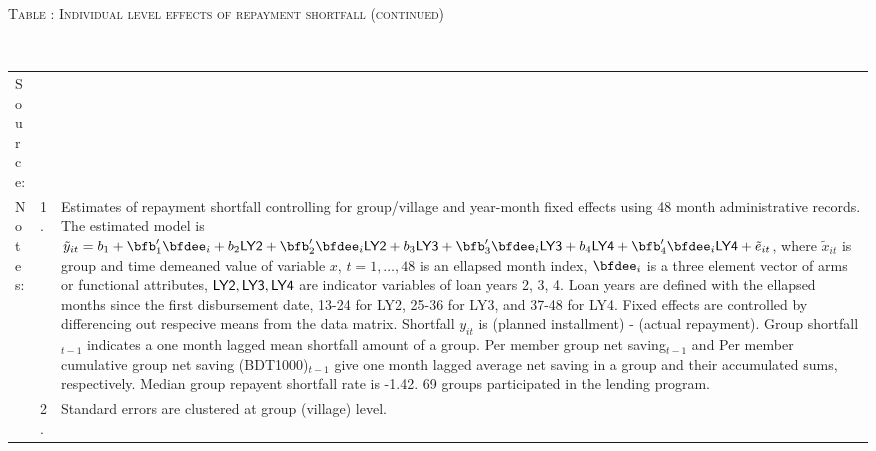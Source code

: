 \addtocounter{table}{-1}
\hspace{-1cm}\begin{minipage}[t]{14cm}
\hfil\textsc{\normalsize Table \thetable: Individual level effects of repayment shortfall (continued)\label{tab shortfall indiv o800 3}}\\
\setlength{\tabcolsep}{1pt}
\setlength{\baselineskip}{8pt}
\renewcommand{\arraystretch}{.6}
\hfil{}\\
\renewcommand{\arraystretch}{.8}
\setlength{\tabcolsep}{1pt}
\begin{tabular}{>{\hfill\scriptsize}p{1cm}<{}>{\hfill\scriptsize}p{.25cm}<{}>{\scriptsize}p{12cm}<{\hfill}}
Source:& \multicolumn{2}{l}{\scriptsize Estimated with GUK administrative data.}\\
Notes: & 1. & Estimates of repayment shortfall controlling for group/village and year-month fixed effects using 48 month administrative records. The estimated model is $\tilde{y}_{it}=b_{1}+\bfb'_{1}\bfdee_{i}+b_{2}\mbox{\textsf{LY2}}+\bfb'_{2}\bfdee_{i}\mbox{\textsf{LY2}}+b_{3}\mbox{\textsf{LY3}}+\bfb'_{3}\bfdee_{i}\mbox{\textsf{LY3}}+b_{4}\mbox{\textsf{LY4}}+\bfb'_{4}\bfdee_{i}\mbox{\textsf{LY4}}+\tilde{e}_{it}$, where $\tilde{x}_{it}$ is group and time demeaned value of variable $x$, $t=1,\dots, 48$ is an ellapsed month index, $\bfdee_{i}$ is a three element vector of arms or functional attributes, $\mbox{\textsf{LY2}}, \mbox{\textsf{LY3}}, \mbox{\textsf{LY4}}$ are indicator variables of loan years 2, 3, 4. Loan years are defined with the ellapsed months since the first disbursement date, 13-24 for \textsf{LY2}, 25-36 for \textsf{LY3}, and 37-48 for \textsf{LY4}. Fixed effects are controlled by differencing out respecive means from the data matrix. Shortfall $y_{it}$ is (planned installment) - (actual repayment). \textsf{Group shortfall}$_{t-1}$ indicates a one month lagged mean shortfall amount of a group. \textsf{Per member group net saving}$_{t-1}$ and \textsf{Per member cumulative group net saving (BDT1000)}$_{t-1}$ give one month lagged average net saving in a group and their accumulated sums, respectively. Median group repayent shortfall rate is -1.42. 69 groups participated in the lending program. \\
& 2. & Standard errors are clustered at group (village) level.
\end{tabular}
\end{minipage}


